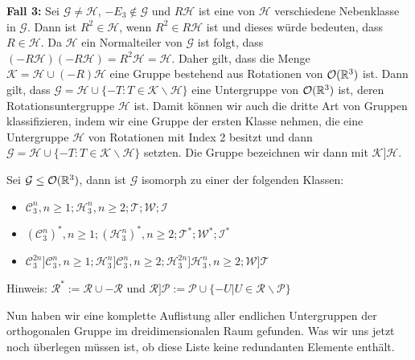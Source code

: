  \textbf{Fall 3:} Sei $\mathcal{G}\neq \mathcal{H}$, $-E_3 \notin \mathcal{G}$ und $R\mathcal{H}$ ist eine von $\mathcal{H}$ verschiedene Nebenklasse in $\mathcal{G}$. Dann ist $R^2\in\mathcal{H}$, wenn $R^2 \in R \mathcal{H}$ ist und dieses würde bedeuten, dass $R \in \mathcal{H}$. Da $\mathcal{H}$ ein Normalteiler von $\mathcal{G}$ ist folgt, dass $(-R\mathcal{H})(-R\mathcal{H})=R^2\mathcal{H}=\mathcal{H}$. Daher gilt, dass die Menge $\mathcal{K} = \mathcal{H} \cup (-R)\mathcal{H}$ eine Gruppe bestehend aus Rotationen von ${\mathcal{O}(\mathbb{R}^3)}$ ist. Dann gilt, dass $\mathcal{G} = \mathcal{H} \cup \{-T:T\in\mathcal{K}\backslash\mathcal{H}\}$ eine Untergruppe von ${\mathcal{O}(\mathbb{R}^3)}$ ist, deren Rotationsuntergruppe $\mathcal{H}$ ist. Damit können wir auch die dritte Art von Gruppen klassifizieren, indem wir eine Gruppe der ersten Klasse nehmen, die eine Untergruppe $\mathcal{H}$ von Rotationen mit Index 2 besitzt und dann $\mathcal{G}=\mathcal{H}\cup\{-T:T\in\mathcal{K}\backslash\mathcal{H}\}$ setzten. Die Gruppe bezeichnen wir dann mit $\mathcal{K}]\mathcal{H}$.


\begin{theorem}
 Sei $\mathcal{G}\leq{\mathcal{O}(\mathbb{R}^3)}$, dann ist $\mathcal{G}$ isomorph zu einer der folgenden Klassen:
 \begin{itemize}
  \item $\mathcal{C}^n_3,n\geq1;\mathcal{H}^n_3,n\geq2;\mathcal{T};\mathcal{W};\mathcal{I}$
  \item $(\mathcal{C}^n_3)^*,n\geq1;(\mathcal{H}^n_3)^*,n\geq 2;\mathcal{T}^*;\mathcal{W}^*;\mathcal{I}^*$
  \item $\mathcal{C}^{2n}_3]\mathcal{C}^n_3,n\geq1;\mathcal{H}^n_3]\mathcal{C}^n_3,n\geq 2;\mathcal{H}^{2n}_3]\mathcal{H}^n_3,n\geq2;\mathcal{W}]\mathcal{T}$
\end{itemize}
Hinweis: $\mathcal{R}^*:=\mathcal{R}\cup -\mathcal{R}$ und $\mathcal{R}]\mathcal{P}:=\mathcal{P}\cup \{-U|U\in \mathcal{R} \backslash \mathcal{P} \}$
\end{theorem}
Nun haben wir eine komplette Auflistung aller endlichen Untergruppen der orthogonalen Gruppe im dreidimensionalen Raum gefunden. Was wir uns jetzt noch überlegen müssen ist, ob diese Liste keine redundanten Elemente enthält.


